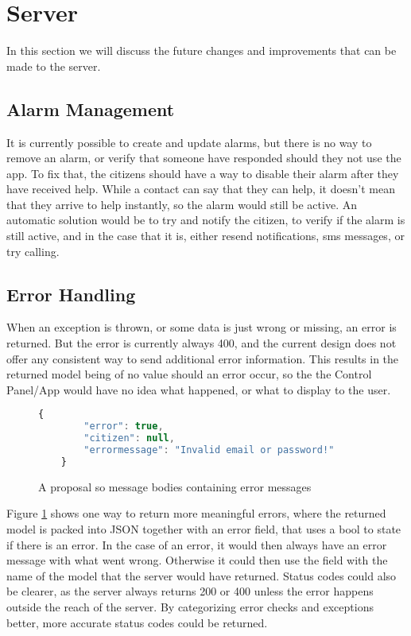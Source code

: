 \section{Server}

In this section we will discuss the future changes and improvements that can be made to the server.

\subsection{Alarm Management}

It is currently possible to create and update alarms, but there is no way to remove an alarm, or verify that someone have responded should they not use the app. 
To fix that, the citizens should have a way to disable their alarm after they have received help. While a contact can say that they can help, it doesn't mean that they arrive to help instantly, so the alarm would still be active.
An automatic solution would be to try and notify the citizen, to verify if the alarm is still active, and in the case that it is, either resend notifications, sms messages, or try calling.


\subsection{Error Handling}

When an exception is thrown, or some data is just wrong or missing, an error is returned. But the error is currently always 400, and the current design does not offer any consistent way to send additional error information. This results in the returned model being of no value should an error occur, so the the Control Panel/App would have no idea what happened, or what to display to the user.

\begin{figure}[h]
    \centering
    \begin{lstlisting}[language=Javascript]
    {
        "error": true,
        "citizen": null,
        "errormessage": "Invalid email or password!"
    }
    \end{lstlisting}
    \caption{A proposal so message bodies containing error messages}
    \label{fig:response_with_error}
\end{figure}

Figure \ref{fig:response_with_error} shows one way to return more meaningful errors, where the returned model is packed into JSON together with an error field, that uses a bool to state if there is an error. In the case of an error, it would then always have an error message with what went wrong. Otherwise it could then use the field with the name of the model that the server would have returned.
Status codes could also be clearer, as the server always returns 200 or 400 unless the error happens outside the reach of the server. By categorizing error checks and exceptions better, more accurate status codes could be returned.

